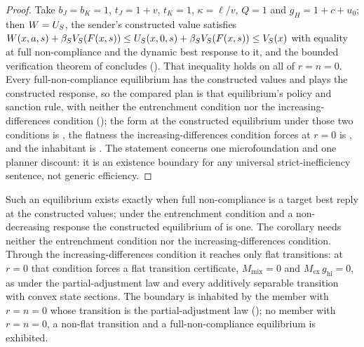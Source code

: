 \begin{proof}
Take
$b_J=b_K=1$, $t_J=1+v$, $t_K=1$, $\kappa=\ell/v$, $Q=1$ and $g_H=1+c+u_0$;
then $W=U_S$, the sender's constructed value satisfies
$W(x,a,s)+\beta_S V_S(F(x,s))\le U_S(x,0,s)+\beta_S V_S(F(x,s))\le V_S(x)$
with equality at full non-compliance and the dynamic best response to it, and the bounded
verification theorem of 
concludes (). That inequality holds
on all of $r=n=0$. Every full-non-compliance equilibrium has the constructed values
and plays the constructed response, so the compared plan is that
equilibrium's policy and sanction rule, with neither the entrenchment condition nor the increasing-differences condition
(); the form at the
constructed equilibrium under those two conditions is
, the flatness the
increasing-differences condition forces at $r=0$ is , and the
inhabitant is . The
statement concerns one microfoundation and one planner discount: it is an
existence boundary for any universal strict-inefficiency sentence, not
generic efficiency.
\end{proof}

Such an equilibrium exists exactly when full non-compliance is a target best reply
at the constructed values; under the entrenchment condition and a non-decreasing
response the constructed equilibrium of  is one.
The corollary needs neither the entrenchment condition nor the increasing-differences condition. Through the increasing-differences condition it reaches only flat
transitions: at $r=0$ that condition forces a flat transition certificate,
$M_{\mathrm{mix}}=0$ and $M_{\mathrm{cx}}\,g_{\mathrm{hi}}=0$, as under the
partial-adjustment law and every additively separable transition with convex state
sections. The boundary is inhabited by the member with $r=n=0$ whose transition is the partial-adjustment law
(); no member with $r=n=0$, a non-flat transition and a
full-non-compliance equilibrium is exhibited.

